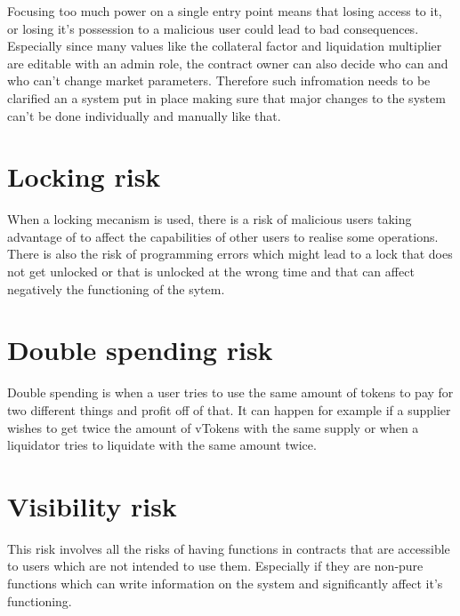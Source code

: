 Focusing too much power on a single entry point means that losing access to it, or losing it's possession to a malicious user could lead to bad consequences. Especially since many values like the collateral factor and liquidation multiplier are editable with an admin role, the contract owner can also decide who can and who can't change market parameters. Therefore such infromation needs to be clarified an a system put in place making sure that major changes to the system can't be done individually and manually like that.

\section{Locking risk} %

When a locking mecanism is used, there is a risk of malicious users taking advantage of to affect the capabilities of other users to realise some operations. There is also the risk of programming errors which might lead to a lock that does not get unlocked or that is unlocked at the wrong time and that can affect negatively the functioning of the sytem.

\section{Double spending risk} %

Double spending is when a user tries to use the same amount of tokens to pay for two different things and profit off of that. It can happen for example if a supplier wishes to get twice the amount of vTokens with the same supply or when a liquidator tries to liquidate with the same amount twice.

 \section{Visibility risk} %

This risk involves all the risks of having functions in contracts that are accessible to users which are not intended to use them. Especially if they are non-pure functions which can write information on the system and significantly affect it's functioning.
